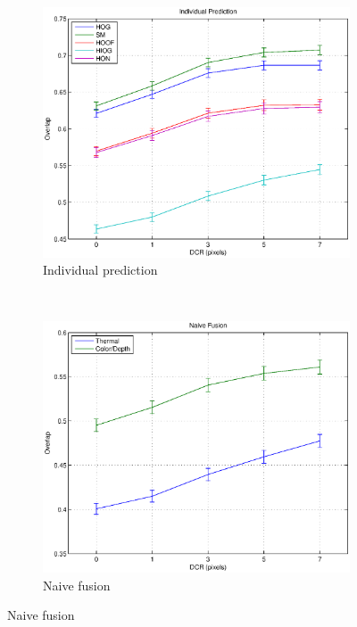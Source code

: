 \documentclass[10pt,twocolumn,letterpaper]{article}
\begin{document}
 \begin{figure}[H]
	 \centering
	 \begin{subfigure}[b]{0.47\textwidth}
 		\includegraphics[width=1\textwidth]{results/individualprediction.eps}
 		\caption{Individual prediction}
    		\label{fig:individualprediction}
 	\end{subfigure}
	 ~
	\begin{subfigure}[b]{0.47\textwidth}
 		\includegraphics[width=1\textwidth]{results/naivefusion.eps}
 		\caption{Naive fusion}
    		\label{fig:naivefusion}
 	\end{subfigure}

\end{figure}
\end{document}
